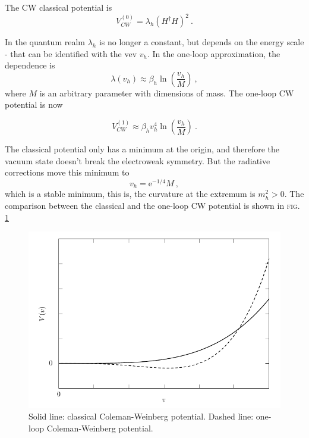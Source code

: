 \documentclass[aps,prd,preprintnumbers,nofootinbibn,twocolumn]{revtex4}
\begin{document}
The CW classical potential is
\begin{equation}
V_{CW}^{(0)} = \lambda_h (H^\dagger H)^2\ .
\end{equation}

In the quantum realm $\lambda_h$ is no longer a constant, but depends on the energy scale - that can be identified with the vev $v_h$. In the one-loop approximation, the dependence is 
\begin{equation}
\lambda(v_h) \approx \beta_h \ln\left(\frac{v_h}{M}\right)\ , 
\end{equation}
where $M$ is an arbitrary parameter with dimensions of mass. The one-loop CW potential is now

\begin{equation}
V_{CW}^{(1)} \approx \beta_h v_h^4 \ln \left(\frac{v_h}{M}\right)\ .
\end{equation}

The classical potential only has a minimum at the origin, and therefore the vacuum state doesn't break the electroweak symmetry. But the radiative corrections move this minimum to 
\begin{equation}
v_h = \mathrm{e}^{-1/4} M\ ,
\end{equation}
which is a stable minimum, this is, the curvature at the extremum is $m_h^2 > 0$. The comparison between the classical and the one-loop CW potential is shown in \textsc{fig.} \ref{fig:CWpotential}

\begin{figure}[b]
\centering
\includegraphics[width=\columnwidth]{potential}
\caption{Solid line: classical Coleman-Weinberg potential. Dashed line: one-loop Coleman-Weinberg potential.}\label{fig:CWpotential}
\end{figure} 
\end{document}
